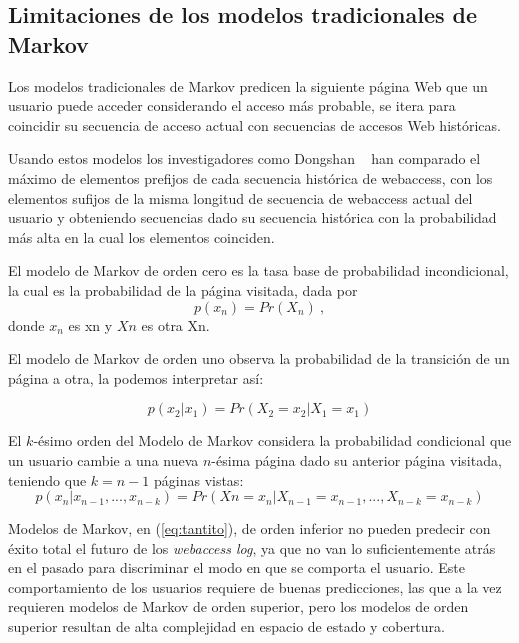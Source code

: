  
 
 \subsection{Limitaciones de los modelos tradicionales de Markov}
 
 
 Los modelos tradicionales de Markov predicen la siguiente página Web que un usuario puede acceder considerando el acceso más probable, se itera para  coincidir su secuencia de acceso actual con secuencias de accesos Web históricas.
 
 
 Usando estos modelos los investigadores como  Dongshan \etal~\cite{Dongshan2002} han comparado  el máximo de elementos  prefijos de cada secuencia histórica de webaccess,  con los elementos sufijos de la  misma longitud de secuencia de webaccess actual del usuario y obteniendo secuencias dado su secuencia histórica con la probabilidad más alta en la cual los elementos coinciden.
 
 El modelo de Markov de orden cero es la tasa base de probabilidad incondicional, la cual es la probabilidad de la página visitada, dada por
 \begin{equation}
p(x_n) = Pr(X_n)\ ,
 \end{equation}	
 donde $x_{n}$ es xn y $Xn$ es otra Xn.
 
 El modelo de Markov de orden uno observa la probabilidad de la transición de un página a otra, la podemos interpretar así:
 
 \begin{equation} 
	 p(x_{2} | x_1) = Pr(X_2 = x_2 | X_1 = x_1) 
 \end{equation}	
 
 El $k$-ésimo orden del Modelo de Markov considera la probabilidad condicional que un usuario cambie a una nueva  $n$-ésima página  dado su anterior página visitada, teniendo que $k = n -1$ páginas vistas:
 \begin{equation}\label{eq:tantito}
p( x_{n} | x_{n-1},..., x_{n-k} ) = Pr(X{n} = x_{n} | X_{n-1} = x_{n-1},..., X_{n-k} = x_{n-k}) 
 \end{equation}


 
 
 Modelos de Markov, en (\ref{eq:tantito}), de orden inferior no pueden predecir con éxito total el futuro de los \emph{webaccess log}, ya que no van lo suficientemente atrás en el pasado para discriminar el modo en que se comporta el usuario. Este comportamiento de los usuarios requiere de buenas predicciones, las que a la vez requieren modelos de Markov de orden superior, pero los modelos de orden superior resultan de alta complejidad en espacio de estado y cobertura. 
 
